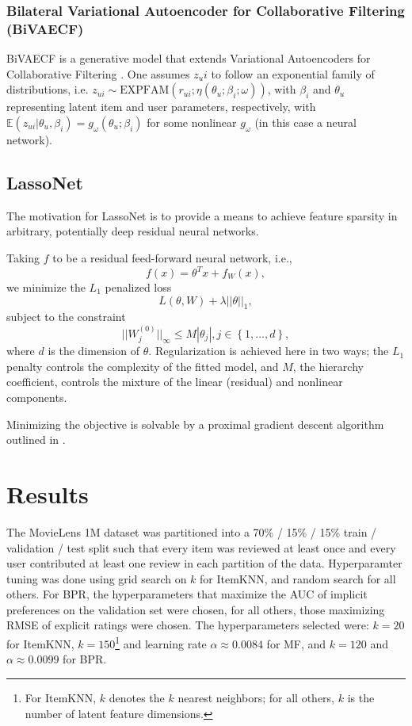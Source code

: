 \documentclass{article}
\begin{document}
\subsubsection{Bilateral Variational Autoencoder for Collaborative
  Filtering (BiVAECF)}

BiVAECF is a generative model that extends Variational Autoencoders for
Collaborative Filtering \cite{liang2018variational}.  One assumes $z_ui$
to follow an exponential family of distributions, i.e. $z_{ui} \sim
  \textrm{EXPFAM}(r_{ui};\eta(\theta_u;\beta_i;\omega))$, with $\beta_i$ and
$\theta_u$ representing latent item and user parameters, respectively,
with $\mathbb{E}(z_{ui}|{\theta}_u,{\beta}_i) =
  g_{\omega}({\theta}_u;{\beta}_i)$ for some nonlinear $g_{\omega}$
(in this case a neural network).

\subsection{LassoNet}

The motivation for LassoNet is to provide a means to achieve feature
sparsity in arbitrary, potentially deep residual neural networks.

Taking $f$ to be a residual feed-forward neural network, i.e.,
$$f(x) = \theta^Tx + f_W(x),$$ we minimize the $L_1$ penalized loss
$$L(\theta, W) + \lambda||\theta||_1,$$ subject to the constraint
$$||W^{(0)}_j||_\infty \leq M|\theta_j|, j \in \left\{1, \ldots, d\right\},$$
where $d$ is the dimension of $\theta$.  Regularization is achieved here in
two ways; the $L_1$ penalty controls the complexity of the fitted model,
and $M$, the hierarchy coefficient, controls the mixture of the
linear (residual) and nonlinear components.

Minimizing the objective is solvable by a proximal gradient descent algorithm
outlined in \cite{lemhadri_lassonet_2021}.

\section{Results}

The MovieLens 1M dataset was partitioned into a 70\% / 15\% / 15\% train
/ validation / test split such that every item was reviewed at least once and
every user contributed at least one review in each partition of the data.
Hyperparamter tuning was done using grid search on $k$ for ItemKNN, and
random search for all others.  For BPR, the hyperparameters that
maximize the AUC of implicit preferences on the validation set were
chosen, for all others, those maximizing RMSE of explicit ratings were
chosen.  The hyperparameters selected were: $k=20$ for ItemKNN,
$k=150$\footnote{For ItemKNN, $k$ denotes the $k$ nearest neighbors; for
  all others, $k$ is the number of latent feature dimensions.} and
learning rate $\alpha \approx 0.0084$ for MF, and $k=120$ and $\alpha
  \approx 0.0099$ for BPR.
\end{document}
